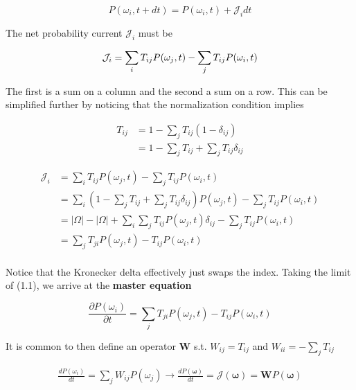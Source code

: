 \documentclass{ucetd}
\begin{document}
\begin{equation}
P(\omega_{i},t+dt) = P(\omega_{i},t) + \mathcal{J}_{i}dt
\end{equation}

The net probability current $\mathcal{J}_{i}$ must be 

\begin{equation*}
\mathcal{J}_{i} = \sum_{i}T_{ij}P(\omega_{j},t) - \sum_{j}T_{ij}P(\omega_{i},t)\\
\end{equation*}

The first is a sum on a column and the second a sum on a row. This can be simplified further by noticing that the normalization condition implies

\begin{align*}
T_{ij} &= 1 - \sum_{j}T_{ij}(1-\delta_{ij})\\
&= 1 - \sum_{j}T_{ij} + \sum_{j}T_{ij}\delta_{ij}
\end{align*}


\begin{align*}
\mathcal{J}_{i} &= \sum_{i}T_{ij}P(\omega_{j},t) - \sum_{j}T_{ij}P(\omega_{i},t)\\
&= \sum_{i}\left(1 - \sum_{j}T_{ij} + \sum_{j}T_{ij}\delta_{ij}\right)P(\omega_{j},t) - \sum_{j}T_{ij}P(\omega_{i},t)\\
&= |\Omega| - |\Omega| + \sum_{i}\sum_{j}T_{ij}P(\omega_{j},t)\delta_{ij} - \sum_{j}T_{ij}P(\omega_{i},t)\\
&= \sum_{j}T_{ji}P(\omega_{j},t) - T_{ij}P(\omega_{i},t)\\
\end{align*}

Notice that the Kronecker delta effectively just swaps the index. Taking the limit of (1.1), we arrive at the \textbf{master equation}


\begin{equation*}
\frac{\partial P(\omega_{i})}{\partial t} = \sum_{j}T_{ji}P(\omega_{j},t) - T_{ij}P(\omega_{i},t)
\end{equation*}

It is common to then define an operator $\bm{W}$ s.t. $W_{ij} = T_{ij}$ and $W_{ii} = -\sum_{j}T_{ij}$ 

\begin{align*}
\frac{dP(\omega_{i})}{dt} = \sum_{j}W_{ij}P(\omega_{j}) \rightarrow \frac{dP(\bm{\omega})}{dt} = \mathcal{J}(\bm{\omega}) = \mathbf{W}P(\bm{\omega})
\end{align*}
\end{document}
